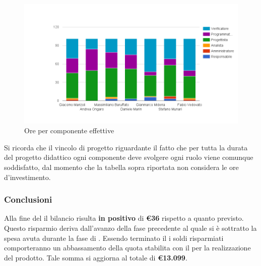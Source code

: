 \FloatBarrier
\begin{figure}[htbp]
\centering
\includegraphics[width=\textwidth]{../immagini/nuoviGrafici/componenti/totaleOrePerRuoloFinali.png}
\caption{Ore per componente effettive}
\end{figure}
\FloatBarrier
Si ricorda che il vincolo di progetto riguardante il fatto che per tutta la durata del progetto didattico ogni componente deve svolgere ogni ruolo viene comunque soddisfatto, dal momento che la tabella sopra riportata non considera le ore d'investimento.
\subsubsection{Conclusioni}
Alla fine del  il bilancio risulta \textbf{in positivo} di \textbf{\euro36} rispetto a quanto previsto.
Questo risparmio deriva dall'avanzo della fase precedente al quale si è sottratto la spesa avuta durante la fase di \fVV.
Essendo terminato il  i soldi risparmiati comporteranno un abbassamento della quota stabilita con il  per la realizzazione del prodotto.\newline
Tale somma si aggiorna al totale di \textbf{\euro13.099}.
